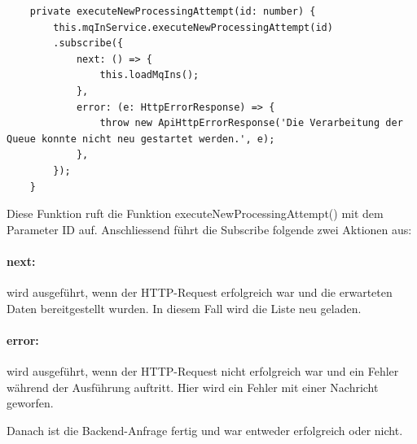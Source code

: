 \begin{verbatim}
	private executeNewProcessingAttempt(id: number) {
		this.mqInService.executeNewProcessingAttempt(id)
		.subscribe({
			next: () => {
				this.loadMqIns();
			},
			error: (e: HttpErrorResponse) => {
				throw new ApiHttpErrorResponse('Die Verarbeitung der Queue konnte nicht neu gestartet werden.', e);
			},
		});
	}
\end{verbatim}

\noindent Diese Funktion ruft die Funktion executeNewProcessingAttempt() mit dem Parameter ID auf. Anschliessend führt die Subscribe folgende zwei Aktionen aus:

\paragraph{next:} wird ausgeführt, wenn der HTTP-Request erfolgreich war und die erwarteten Daten bereitgestellt wurden. In diesem Fall wird die Liste neu geladen.
\paragraph{error:} wird ausgeführt, wenn der HTTP-Request nicht erfolgreich war und ein Fehler während der Ausführung auftritt. Hier wird ein Fehler mit einer Nachricht geworfen.\newline

\noindent Danach ist die Backend-Anfrage fertig und war entweder erfolgreich oder nicht.


\newpage